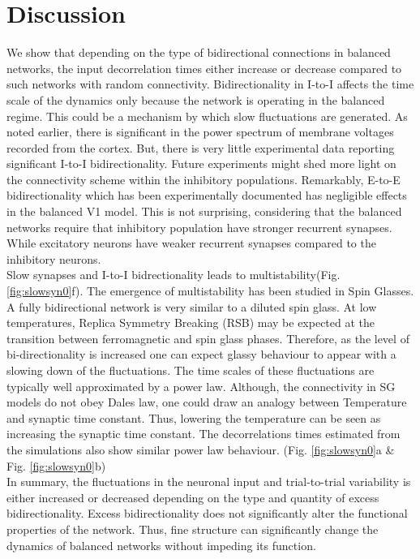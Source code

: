 \section{Discussion}
We show that depending on the type of bidirectional connections in balanced networks, the input decorrelation times either increase or decrease compared to such networks with random connectivity. Bidirectionality in I-to-I affects the time scale of the dynamics only because the network is operating in the balanced regime. This could be a mechanism by which slow fluctuations are generated. As noted earlier, there is significant in the power spectrum of membrane voltages recorded from the cortex. But, there is very little experimental data reporting significant I-to-I bidirectionality. Future experiments might shed more light on the connectivity scheme within the inhibitory populations. Remarkably, E-to-E bidirectionality which has been experimentally documented has negligible effects in the balanced V1 model. This is not surprising, considering that the balanced networks require that inhibitory population have stronger recurrent synapses. While excitatory neurons have weaker recurrent synapses compared to the inhibitory neurons. \\
Slow synapses and I-to-I bidrectionality leads to multistability(Fig. \ref{fig:slowsyn0}f). The emergence of multistability has been studied in Spin Glasses. A fully bidirectional network is very similar to a diluted spin glass\cite{megard1987spin}. At low temperatures, Replica Symmetry Breaking (RSB) may be expected at the transition between ferromagnetic and spin glass phases. Therefore, as the level of bi-directionality is increased one can expect glassy behaviour to appear with a slowing down of the fluctuations\cite{Crisanti1987, Crisanti1988}. The time scales of these fluctuations are typically well approximated by a power law. Although, the connectivity in SG models do not obey Dales law, one could draw an analogy between Temperature and synaptic time constant. Thus, lowering the temperature can be seen as increasing the synaptic time constant. The decorrelations times estimated from the simulations also show similar power law behaviour. (Fig. \ref{fig:slowsyn0}a \& Fig. \ref{fig:slowsyn0}b) \\
In summary, the fluctuations in the neuronal input and trial-to-trial variability is either increased or decreased depending on the type and quantity of excess bidirectionality. Excess bidirectionality does not significantly alter the functional properties of the network. Thus, fine structure can significantly change the dynamics of balanced networks without impeding its function. 

